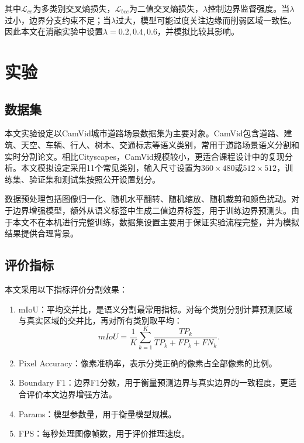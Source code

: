 \documentclass{report}
\begin{document}
其中$\mathcal{L}_{ce}$为多类别交叉熵损失，$\mathcal{L}_{bce}$为二值交叉熵损失，$\lambda$控制边界监督强度。当$\lambda$过小，边界分支约束不足；当$\lambda$过大，模型可能过度关注边缘而削弱区域一致性。因此本文在消融实验中设置$\lambda=0.2,0.4,0.6$，并模拟比较其影响。

\section{实验}

\subsection{数据集}

本文实验设定以CamVid城市道路场景数据集为主要对象。CamVid包含道路、建筑、天空、车辆、行人、树木、交通标志等语义类别，常用于道路场景语义分割和实时分割论文。相比Cityscapes，CamVid规模较小，更适合课程设计中的复现分析。本文模拟设定采用11个常见类别，输入尺寸设置为$360 \times 480$或$512 \times 512$，训练集、验证集和测试集按照公开设置划分。

数据预处理包括图像归一化、随机水平翻转、随机缩放、随机裁剪和颜色扰动。对于边界增强模型，额外从语义标签中生成二值边界标签，用于训练边界预测头。由于本文不在本机进行完整训练，数据集设置主要用于保证实验流程完整，并为模拟结果提供合理背景。

\subsection{评价指标}

本文采用以下指标评价分割效果：

\begin{enumerate}
    \item mIoU：平均交并比，是语义分割最常用指标。对每个类别分别计算预测区域与真实区域的交并比，再对所有类别取平均：
    \begin{equation}
    mIoU = \frac{1}{K}\sum_{k=1}^{K}\frac{TP_k}{TP_k + FP_k + FN_k}.
    \end{equation}
    \item Pixel Accuracy：像素准确率，表示分类正确的像素占全部像素的比例。
    \item Boundary F1：边界F1分数，用于衡量预测边界与真实边界的一致程度，更适合评价本文边界增强方法。
    \item Params：模型参数量，用于衡量模型规模。
    \item FPS：每秒处理图像帧数，用于评价推理速度。
\end{enumerate}
\end{document}
